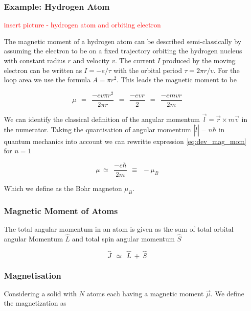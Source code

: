 \documentclass[10pt]{report}
\numberwithin{equation}{chapter}
\begin{document}
\subsubsection{Example: Hydrogen Atom}

\textcolor{red}{insert picture - hydrogen atom and orbiting electron}

The magnetic moment of a hydrogen atom can be described semi-classically by assuming the electron to be on a fixed trajectory orbiting the hydrogen nucleus with constant radius $r$ and velocity $v$. The current $I$ produced by the moving electron can be written as $I = -e/\tau$ with the orbital period $\tau = 2\pi r/v$. For the loop area we use the formula $A= \pi r^2$. This leads the magnetic moment to be

\begin{equation} \label{eq:dev_mag_mom}
  \mu ~~=~~ \frac{-e v \pi r^2}{2 \pi r} ~~=~~ \frac{-evr}{2} ~~=~~ \frac{-e m v r}{2m}
\end{equation}

We can identify the classical definition of the angular momentum  $\vec{l} = \vec{r} \times m \vec{v}$ in the numerator. Taking the quantisation of angular momentum $|\hat{l}| = n \hbar$ in quantum mechanics into account we can rewritte expression \ref{eq:dev_mag_mom} for $n=1$

\begin{equation} \label{eq:bohr_mag}
  \mu ~≃ ~~ \frac{-e \hbar}{2m} ~~ \equiv ~~ -\mu_B
\end{equation}

Which we define as the Bohr magneton $\mu_B$.


\subsubsection{Magnetic Moment of Atoms}

The total angular momentum in an atom is given as the sum of total orbital angular Momentum $\hat{L}$  and total spin angular momentum $\hat{S}$

\begin{equation}
  \hat{J} ~~≃~~ \hat{L} ~+~ \hat{S}
\end{equation}

\subsubsection{Magnetisation}

Considering a solid with $N$ atoms each having a magnetic moment $\vec{\mu}$. We define the magnetization as 
\end{document}
